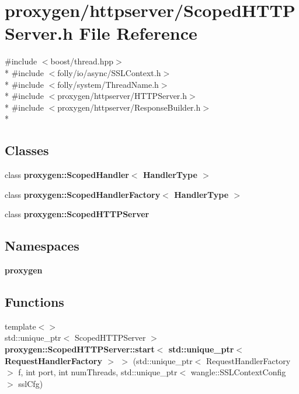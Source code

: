 \section{proxygen/httpserver/\+Scoped\+H\+T\+T\+P\+Server.h File Reference}
\label{ScopedHTTPServer_8h}
{\ttfamily \#include $<$boost/thread.\+hpp$>$}\\*
{\ttfamily \#include $<$folly/io/async/\+S\+S\+L\+Context.\+h$>$}\\*
{\ttfamily \#include $<$folly/system/\+Thread\+Name.\+h$>$}\\*
{\ttfamily \#include $<$proxygen/httpserver/\+H\+T\+T\+P\+Server.\+h$>$}\\*
{\ttfamily \#include $<$proxygen/httpserver/\+Response\+Builder.\+h$>$}\\*
\subsection*{Classes}
\begin{DoxyCompactItemize}
\item 
class {\bf proxygen\+::\+Scoped\+Handler$<$ Handler\+Type $>$}
\item 
class {\bf proxygen\+::\+Scoped\+Handler\+Factory$<$ Handler\+Type $>$}
\item 
class {\bf proxygen\+::\+Scoped\+H\+T\+T\+P\+Server}
\end{DoxyCompactItemize}
\subsection*{Namespaces}
\begin{DoxyCompactItemize}
\item 
 {\bf proxygen}
\end{DoxyCompactItemize}
\subsection*{Functions}
\begin{DoxyCompactItemize}
\item 
{\footnotesize template$<$$>$ }\\std\+::unique\+\_\+ptr$<$ Scoped\+H\+T\+T\+P\+Server $>$ {\bf proxygen\+::\+Scoped\+H\+T\+T\+P\+Server\+::start$<$ std\+::unique\+\_\+ptr$<$ Request\+Handler\+Factory $>$ $>$} (std\+::unique\+\_\+ptr$<$ Request\+Handler\+Factory $>$ f, int port, int num\+Threads, std\+::unique\+\_\+ptr$<$ wangle\+::\+S\+S\+L\+Context\+Config $>$ ssl\+Cfg)
\end{DoxyCompactItemize}
